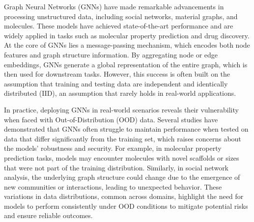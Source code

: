 
Graph Neural Networks (GNNs) have made remarkable advancements in processing unstructured data, including social networks, material graphs, and molecules. These models have achieved state-of-the-art performance and are widely applied in tasks such as molecular property prediction and drug discovery. At the core of GNNs lies a message-passing mechanism, which encodes both node features and graph structure information. By aggregating node or edge embeddings, GNNs generate a global representation of the entire graph, which is then used for downstream tasks. However, this success is often built on the assumption that training and testing data are independent and identically distributed (IID), an assumption that rarely holds in real-world applications.

In practice, deploying GNNs in real-world scenarios reveals their vulnerability when faced with Out-of-Distribution (OOD) data. Several studies have demonstrated that GNNs often struggle to maintain performance when tested on data that differ significantly from the training set, which raises concerns about the models' robustness and security. For example, in molecular property prediction tasks, models may encounter molecules with novel scaffolds or sizes that were not part of the training distribution. Similarly, in social network analysis, the underlying graph structure could change due to the emergence of new communities or interactions, leading to unexpected behavior. These variations in data distributions, common across domains, highlight the need for models to perform consistently under OOD conditions to mitigate potential risks and ensure reliable outcomes.

